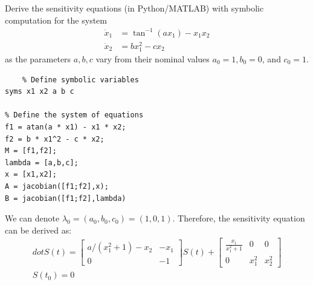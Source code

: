 \begin{problem}[15] \cite{khalil2002nonlinear}
    Derive the sensitivity equations (in Python/MATLAB) with symbolic computation for the system
    \begin{align*}
        \dot{x}_1 &= \tan^{-1}(ax_1) -x_1x_2 \\
        \dot{x}_2 &= bx_1^2 -cx_2
    \end{align*}
    as the parameters $a,b,c$ vary from their nominal values $a_0=1, b_0=0$, and $c_0=1$.
\end{problem}

\begin{answer}
    \begin{lstlisting}
    % Define symbolic variables
syms x1 x2 a b c

% Define the system of equations
f1 = atan(a * x1) - x1 * x2;
f2 = b * x1^2 - c * x2;
M = [f1,f2];
lambda = [a,b,c];
x = [x1,x2];
A = jacobian([f1;f2],x);
B = jacobian([f1;f2],lambda)

    \end{lstlisting}
    We can denote $\lambda_0 =(a_0,b_0,c_0)=(1,0,1)$. Therefore, the sensitivity equation can be derived as:
    \begin{align*}
    		dot{S(t)}=[\begin{matrix}
    		a/(x_1^2 + 1) - x_2 & -x_1\\
    		0&-1
    		\end{matrix}]S(t)+
    		[\begin{matrix}
    		\frac{x_1}{x_1^2+1} & 0 & 0 \\
    		0 & x_1^2 & x_2^2
    		\end{matrix}] \\
    		S(t_0) = 0
    \end{align*}
\end{answer}

